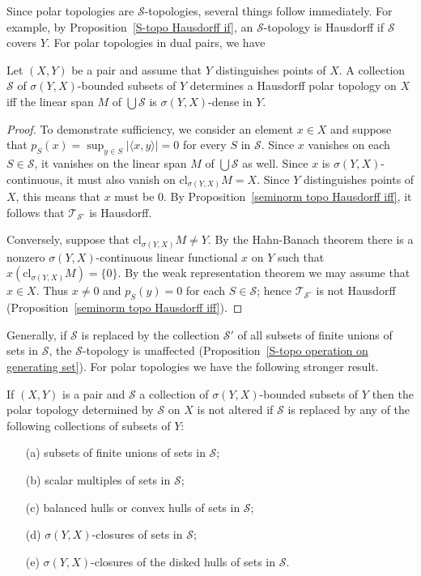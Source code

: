 Since polar topologies are $\mathcal{S}$-topologies, several things follow immediately. For example, by Proposition~\ref{S-topo Hausdorff if}, an $\mathcal{S}$-topology is Hausdorff if $\mathcal{S}$ covers $Y$. For polar topologies in dual pairs, we have
\begin{proposition}\label{polar topo Hausdorff iff}
Let $(X,Y)$ be a pair and assume that $Y$ distinguishes points of $X$. A collection $\mathcal{S}$ of $\sigma(Y,X)$-bounded subsets of $Y$ determines a Hausdorff polar topology on $X$ iff the linear span $M$ of $\bigcup\mathcal{S}$ is $\sigma(Y,X)$-dense in $Y$.
\end{proposition}
\begin{proof}
To demonstrate sufficiency, we consider an element $x\in X$ and suppose that $p_S(x)=\sup_{y\in S}|\langle x,y\rangle|=0$ for every $S$ in $\mathcal{S}$. Since $x$ vanishes on each $S\in\mathcal{S}$, it vanishes on the linear span $M$ of $\bigcup\mathcal{S}$ as well. Since $x$ is $\sigma(Y,X)$-continuous, it must also vanish on $\mathrm{cl}_{\sigma(Y,X)}M=X$. Since $Y$ distinguishes points of $X$, this means that $x$ must be $0$. By Proposition~\ref{seminorm topo Hausdorff iff}, it follows that $\mathcal{T}_{\mathcal{S}^\circ}$ is Hausdorff.\par
Conversely, suppose that $\mathrm{cl}_{\sigma(Y,X)}M\neq Y$. By the Hahn-Banach theorem there is a nonzero $\sigma(Y,X)$-continuous linear functional $x$ on $Y$ such that $x(\mathrm{cl}_{\sigma(Y,X)}M)=\{0\}$. By the weak representation theorem we may assume that $x\in X$. Thus $x\neq 0$ and $p_S(y)=0$ for each $S\in\mathcal{S}$; hence $\mathcal{T}_{\mathcal{S}^\circ}$ is not Hausdorff (Proposition~\ref{seminorm topo Hausdorff iff}).
\end{proof}
Generally, if $\mathcal{S}$ is replaced by the collection $\mathcal{S}'$ of all subsets of finite unions of sets in $\mathcal{S}$, the $\mathcal{S}$-topology is unaffected (Proposition~\ref{S-topo operation on generating set}). For polar topologies we have the following stronger result.
\begin{proposition}\label{polar topo operation on generating set}
If $(X,Y)$ is a pair and $\mathcal{S}$ a collection of $\sigma(Y,X)$-bounded subsets of $Y$ then the polar topology determined by $\mathcal{S}$ on $X$ is not altered if $\mathcal{S}$ is replaced by any of the following collections of subsets of $Y$:
\begin{itemize}
\item[(a)] subsets of finite unions of sets in $\mathcal{S}$;
\item[(b)] scalar multiples of sets in $\mathcal{S}$;
\item[(c)] balanced hulls or convex hulls of sets in $\mathcal{S}$;
\item[(d)] $\sigma(Y,X)$-closures of sets in $\mathcal{S}$;
\item[(e)] $\sigma(Y,X)$-closures of the disked hulls of sets in $\mathcal{S}$.
\end{itemize}
\end{proposition}
